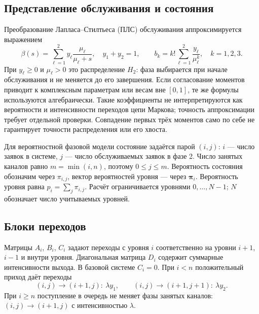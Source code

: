 \documentclass[a4paper,12pt]{article}
\begin{document}
\subsection{Представление обслуживания и состояния}
Преобразование Лапласа--Стилтьеса (ПЛС) обслуживания аппроксимируется выражением
\[
\beta(s)=\sum_{\ell=1}^{2}y_\ell\frac{\mu_\ell}{\mu_\ell+s},\quad
y_1+y_2=1,\qquad
b_k=k!\sum_{\ell=1}^{2}\frac{y_\ell}{\mu_\ell^k},\quad k=1,2,3.
\]
При \(y_\ell\ge0\) и \(\mu_\ell>0\) это распределение \(H_2\): фаза выбирается при начале обслуживания и не меняется до его завершения. Если согласование моментов приводит к комплексным параметрам или весам вне \([0,1]\), те же формулы используются алгебраически. Такие коэффициенты не интерпретируются как вероятности и интенсивности переходов цепи Маркова; точность аппроксимации требует отдельной проверки. Совпадение первых трёх моментов само по себе не гарантирует точности распределения или его хвоста.

Для вероятностной фазовой модели состояние задаётся парой \((i,j)\): \(i\) --- число заявок в системе, \(j\) --- число обслуживаемых заявок в фазе 2. Число занятых каналов равно \(m=\min(i,n)\), поэтому \(0\le j\le m.\) Вероятность состояния обозначим через \(\pi_{i,j}\), вектор вероятностей уровня --- через \(\boldsymbol\pi_i.\) Вероятность уровня равна \(p_i=\sum_j\pi_{i,j}.\) Расчёт ограничивается уровнями \(0,\ldots,N-1\); \(N\) обозначает число учитываемых уровней.

\subsection{Блоки переходов}
Матрицы \(A_i\), \(B_i\), \(C_i\) задают переходы с уровня \(i\) соответственно на уровни \(i+1\), \(i-1\) и внутри уровня. Диагональная матрица \(D_i\) содержит суммарные интенсивности выхода. В базовой системе \(C_i=0.\) При \(i<n\) положительный приход даёт переходы
\[
(i,j)\to(i+1,j):\ \lambda y_1,\qquad
(i,j)\to(i+1,j+1):\ \lambda y_2.
\]
При \(i\ge n\) поступление в очередь не меняет фазы занятых каналов: \((i,j)\to(i+1,j)\) с интенсивностью \(\lambda.\)
\end{document}
